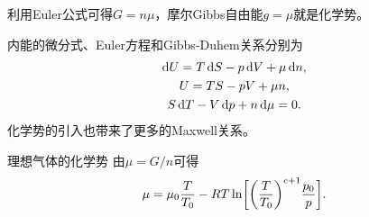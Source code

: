 \begin{corollary}
	利用Euler公式可得$G=n\mu$，摩尔Gibbs自由能$g=\mu$就是化学势。
\end{corollary}

\begin{corollary}
	内能的微分式、Euler方程和Gibbs-Duhem关系分别为
	\begin{subequations}
		\begin{gather}
			\mathop{}\!\mathrm{d} U=T\mathop{}\!\mathrm{d} S-p\mathop{}\!\mathrm{d} V+\mu\mathop{}\!\mathrm{d} n,\\
			U=TS-pV+\mu n,\\
			S\mathop{}\!\mathrm{d} T-V\mathop{}\!\mathrm{d} p+n\mathop{}\!\mathrm{d}\mu=0.
		\end{gather}
	\end{subequations}
	化学势的引入也带来了更多的Maxwell关系。
\end{corollary}

\begin{example}
	{理想气体的化学势}{}
	由$\mu=G/n$可得
	\begin{equation}
		\mu=\mu_0\frac T{T_0}-RT\ln\biggl[\biggl(\frac T{T_0}\biggr)^{c+1}\frac{p_0}p\biggr].
	\end{equation}
\end{example}

